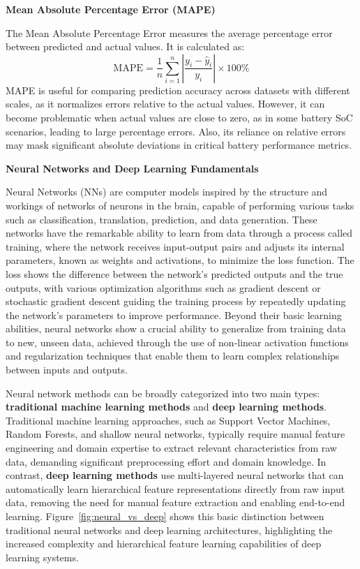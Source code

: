 \vspace{1cm}
\textbf{Mean Absolute Percentage Error (MAPE)}

The Mean Absolute Percentage Error measures the average percentage error between predicted and actual values. It is calculated as:
\begin{equation}
\text{MAPE} = \frac{1}{n} \sum_{i=1}^{n} \left| \frac{y_i - \hat{y}_i}{y_i} \right| \times 100\%
\end{equation}
MAPE is useful for comparing prediction accuracy across datasets with different scales, as it normalizes errors relative to the actual values. However, it can become problematic when actual values are close to zero, as in some battery SoC scenarios, leading to large percentage errors. Also, its reliance on relative errors may mask significant absolute deviations in critical battery performance metrics.

\vspace{1cm}
\textbf{Neural Networks and Deep Learning Fundamentals}

Neural Networks (NNs) are computer models inspired by the structure and workings of networks of neurons in the brain, capable of performing various tasks such as classification, translation, prediction, and data generation. These networks have the remarkable ability to learn from data through a process called training, where the network receives input-output pairs and adjusts its internal parameters, known as weights and activations, to minimize the loss function. The loss shows the difference between the network's predicted outputs and the true outputs, with various optimization algorithms such as gradient descent or stochastic gradient descent guiding the training process by repeatedly updating the network's parameters to improve performance. Beyond their basic learning abilities, neural networks show a crucial ability to generalize from training data to new, unseen data, achieved through the use of non-linear activation functions and regularization techniques that enable them to learn complex relationships between inputs and outputs.

Neural network methods can be broadly categorized into two main types: \textbf{traditional machine learning methods} and \textbf{deep learning methods}. Traditional machine learning approaches, such as Support Vector Machines, Random Forests, and shallow neural networks, typically require manual feature engineering and domain expertise to extract relevant characteristics from raw data, demanding significant preprocessing effort and domain knowledge. In contrast, \textbf{deep learning methods} use multi-layered neural networks that can automatically learn hierarchical feature representations directly from raw input data, removing the need for manual feature extraction and enabling end-to-end learning. Figure~\ref{fig:neural_vs_deep} shows this basic distinction between traditional neural networks and deep learning architectures, highlighting the increased complexity and hierarchical feature learning capabilities of deep learning systems.


